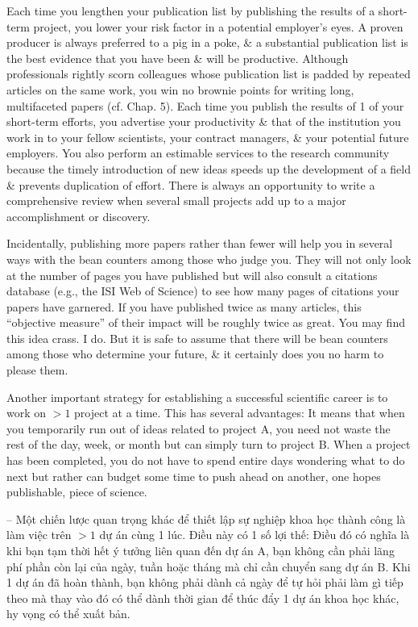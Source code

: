 \documentclass{article}
\begin{document}
\begin{enumerate}
\begin{itemize}
\begin{itemize}
			Each time you lengthen your publication list by publishing the results of a short-term project, you lower your risk factor in a potential employer's eyes. A proven producer is always preferred to a pig in a poke, \& a substantial publication list is the best evidence that you have been \& will be productive. Although professionals rightly scorn colleagues whose publication list is padded by repeated articles on the same work, you win no brownie points for writing long, multifaceted papers (cf. Chap. 5). Each time you publish the results of 1 of your short-term efforts, you advertise your productivity \& that of the institution you work in to your fellow scientists, your contract managers, \& your potential future employers. You also perform an estimable services to the research community because the timely introduction of new ideas speeds up the development of a field \& prevents duplication of effort. There is always an opportunity to write a comprehensive review when several small projects add up to a major accomplishment or discovery.

			Incidentally, publishing more papers rather than fewer will help you in several ways with the bean counters among those who judge you. They will not only look at the number of pages you have published but will also consult a citations database (e.g., the ISI Web of Science) to see how many pages of citations your papers have garnered. If you have published twice as many articles, this ``objective measure'' of their impact will be roughly twice as great. You may find this idea crass. I do. But it is safe to assume that there will be bean counters among those who determine your future, \& it certainly does you no harm to please them.

			Another important strategy for establishing a successful scientific career is to work on $> 1$ project at a time. This has several advantages: It means that when you temporarily run out of ideas related to project A, you need not waste the rest of the day, week, or month but can simply turn to project B. When a project has been completed, you do not have to spend entire days wondering what to do next but rather can budget some time to push ahead on another, one hopes publishable, piece of science.

			-- Một chiến lược quan trọng khác để thiết lập sự nghiệp khoa học thành công là làm việc trên $> 1$ dự án cùng 1 lúc. Điều này có 1 số lợi thế: Điều đó có nghĩa là khi bạn tạm thời hết ý tưởng liên quan đến dự án A, bạn không cần phải lãng phí phần còn lại của ngày, tuần hoặc tháng mà chỉ cần chuyển sang dự án B. Khi 1 dự án đã hoàn thành, bạn không phải dành cả ngày để tự hỏi phải làm gì tiếp theo mà thay vào đó có thể dành thời gian để thúc đẩy 1 dự án khoa học khác, hy vọng có thể xuất bản.


\end{itemize}
\end{itemize}
\end{enumerate}
\end{document}
